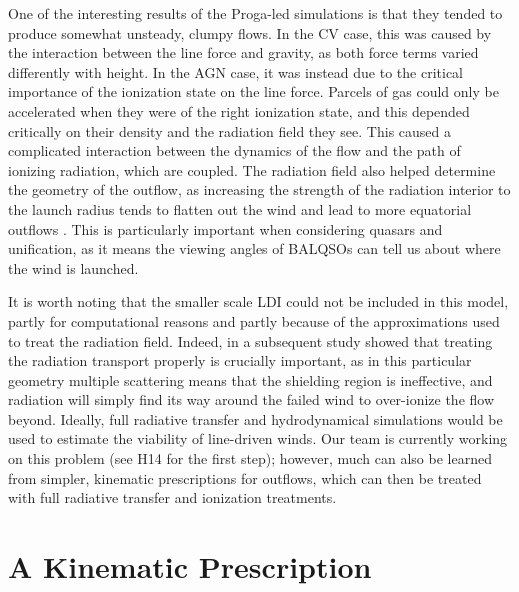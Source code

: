 One of the interesting results of the Proga-led simulations is that they tended
to produce somewhat unsteady, clumpy flows. In the CV case, this was caused by
the interaction between the line force and gravity, as both force terms varied 
differently with height. In the AGN case, it was instead due to the critical
importance of the ionization state on the line force. Parcels of gas could only 
be accelerated when they were of the right ionization state, and this depended
critically on their density and the radiation field they see. This caused a complicated
interaction between the dynamics of the flow and the path of ionizing radiation, 
which are coupled. The radiation field also helped
determine the geometry of the outflow, as increasing the strength of the radiation
interior to the launch radius tends to flatten out the wind and lead to more
equatorial outflows \citep{proga2005}.
This is particularly important when considering quasars and unification, as it means
the viewing angles of BALQSOs can tell us about where the wind is launched.

It is worth noting that the smaller scale LDI could not be included in this model,
partly for computational reasons and partly because of the approximations 
used to treat the radiation field. Indeed, in a subsequent study 
\citep[][hereafter H14]{H14} showed that treating the radiation transport 
properly is crucially important, as in this particular geometry 
multiple scattering means that the shielding region
is ineffective, and radiation will simply find its way around the failed wind
to over-ionize the flow beyond.
Ideally, full radiative transfer and hydrodynamical simulations would be used
to estimate the viability of line-driven winds. Our team is currently working 
on this problem (see H14 for the first step); however, much 
can also be learned from simpler, kinematic prescriptions for outflows, which
can then be treated with full radiative transfer and ionization treatments.  

\section{A Kinematic Prescription}
\label{sec:sv93_model}

